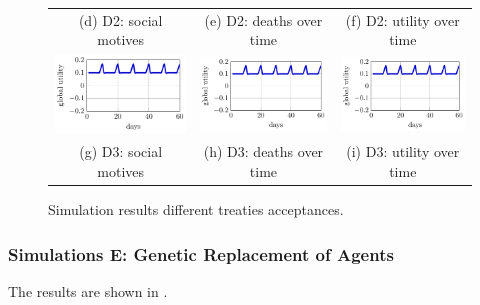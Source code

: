 \begin{figure}[htb]
\begin{tabular}{ccc}
    (d) D2: social motives & (e) D2: deaths over time & (f) D2: utility over time \\[8pt]
    \includegraphics[width=0.3\linewidth]{008_team_6_agent_design/A/SOMAS_A1_utility.pdf} &   \includegraphics[width=0.3\linewidth]{008_team_6_agent_design/A/SOMAS_A1_utility.pdf} &
    \includegraphics[width=0.3\linewidth]{008_team_6_agent_design/A/SOMAS_A1_utility.pdf}\\[0pt]
    (g) D3: social motives & (h) D3: deaths over time & (i) D3: utility over time \\[8pt]
    \end{tabular}
    \caption{Simulation results different treaties acceptances.}
    \label{fig:res_D}%
\end{figure}

\subsubsection{Simulations E: Genetic Replacement of Agents}

 The results are shown in .


